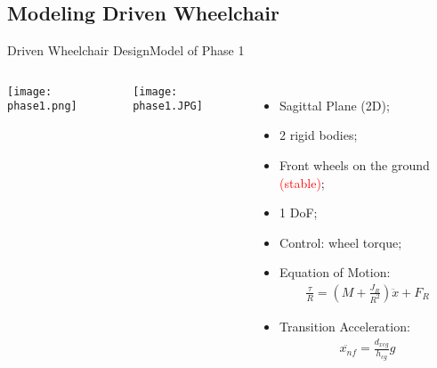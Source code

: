 \documentclass[10pt]{beamer}
\begin{document}
\subsection{Modeling Driven Wheelchair}
\begin{frame}{Driven Wheelchair Design}{Model of Phase 1}
\begin{columns}
\begin{minipage}[c][0.4\textheight][c]{\linewidth}
  \centering
  \texttt{[image: phase1.png]}
\end{minipage}
\begin{minipage}[c][0.4\textheight][c]{\linewidth}
  \centering
  \texttt{[image: phase1.JPG]}
\end{minipage}
\begin{minipage}[c][0.4\textheight][c]{\linewidth}
  \begin{itemize}
  \item Sagittal Plane (2D);
  \item 2 rigid bodies;
  \item Front wheels on the ground \textcolor{red}{(stable)};
  \item 1 DoF; 
  \item Control: wheel torque;
  \item Equation of Motion:
 	\begin{eqnarray*}
 		\frac{\tau}{R} = \left( M + \frac{J_R}{R^2} \right)\ddot{x} + F_R
 	\end{eqnarray*}   
  \item Transition Acceleration:
 	\begin{eqnarray*}
 		\ddot{x_{nf}} = \frac{d_{xcg}}{h_{cg}}g
 	\end{eqnarray*}   
  \end{itemize}
\end{minipage}
\end{columns}
\end{frame}
\end{document}
